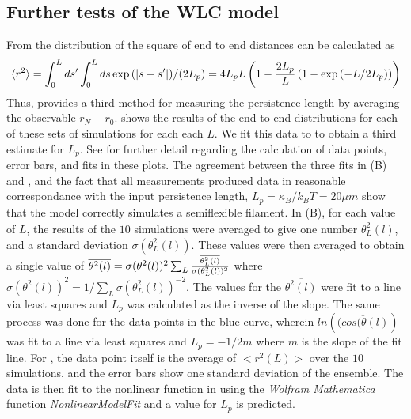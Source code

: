 \documentclass[12pt]{article}
\begin{document}
\subsection{ Further tests of the WLC model }\label{lpCalc}
From  the distribution of the square of end to end distances can be calculated as 
\begin{equation}
  \langle r^2\rangle=\int_0^L{ds'}\int_0^L{ds \exp{(|s-s'|)/(2L_p)}}=4L_p L\left( 1-{2L_p\over L}\left( 1-\exp{(-L/2L_p)} \right) \right)
  \label{eqn:r2}
\end{equation} 
Thus,  provides a third method for measuring the persistence length by
averaging the observable $r_N-r_0$.
 shows the results of the end to end distributions for each of these sets of simulations for each each $L$.  
We fit this data to  to obtain a third estimate for $L_p$. 
See  for further detail regarding the calculation of data points, error bars, and fits in these plots.  
The agreement between the three fits in (B) and , and the
fact that all measurements produced data in reasonable correspondance with the input persistence length, $L_p =
\kappa_B/k_BT = 20\mu m$ show that the model correctly simulates a semiflexible filament. 
In (B), for each value of $L$, the results of the $10$ simulations were averaged to 
give one number $\overline{\theta^2_L(l)}$, and a standard deviation $\sigma(\theta^2_L(l))$. These values were then averaged 
to obtain a single value of $\overline{\theta^2(l)} = \sigma(\theta^2(l))^2\sum_L{\overline{\theta^2_L(l)}\over\sigma(\theta^2_L(l))^2}$ where
$\sigma(\theta^2(l))^2 = 1/\sum_L{\sigma(\theta^2_L(l))^{-2}}$. The values for the $\overline{\theta^2(l)}$ were fit to
a line via least squares and $L_p$ was calculated as the inverse of the slope. The same process was done for the data points in the
blue curve, wherein $ln(\overline{(cos(\theta(l)})$ was fit to a line via least squares and $L_p = -1/2m$ where $m$ is the
slope of the fit line. For , the data point itself is the average of $<r^2(L)>$ over the $10$ simulations, 
and the error bars show one standard deviation of
the ensemble. The data is then fit to the nonlinear function in  using the \textit{Wolfram Mathematica} function  
\textit{NonlinearModelFit} and a value for $L_p$ is predicted. 
\end{document}
